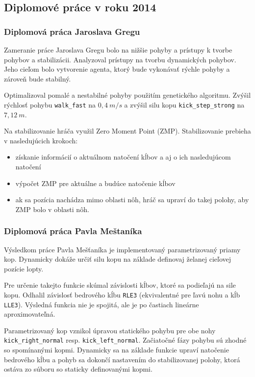\subsection{Diplomové práce v roku 2014}

\subsubsection{Diplomová práca Jaroslava Gregu}
Zameranie práce Jaroslava Gregu \cite{grega} bolo na nižšie pohyby a prístupy k tvorbe pohybov a stabilizácii. Analyzoval prístupy na tvorbu dynamických pohybov. Jeho cieľom bolo vytvorenie agenta, ktorý bude vykonávať rýchle pohyby a zároveň bude stabilný. 

Optimalizoval pomalé a nestabilné pohyby použitím genetického algoritmu. Zvýšil rýchlosť pohybu \texttt{walk\_fast} na $0,4~m/s$ a zvýšil silu kopu \texttt{kick\_step\_strong} na $7,12~m$.

Na stabilizovanie hráča využil Zero Moment Point (ZMP). Stabilizovanie prebieha v nasledujúcich krokoch:
\begin{itemize}
	\item získanie informácií o aktuálnom natočení kĺbov a aj o ich nasledujúcom natočení
	\item výpočet ZMP pre aktuálne a budúce natočenie kĺbov
	\item ak sa pozícia nachádza mimo oblasti nôh, hráč sa upraví do takej polohy, aby ZMP bolo v oblasti nôh.
\end{itemize}

\subsubsection{Diplomová práca Pavla Meštaníka} \label{sec_mestanik}

Výsledkom práce Pavla Mešťaníka \cite{mestanik} je implementovaný parametrizovaný priamy kop. Dynamicky dokáže určiť silu kopu na základe definovaj želanej cieľovej pozície lopty. 

Pre určenie takejto funkcie skúmal závislosti kĺbov, ktoré sa podieľajú na sile kopu. Odhalil závislosť bedrového kĺbu \texttt{RLE3} (ekvivalentné pre ľavú nohu a kĺb \texttt{LLE3}). Výsledná funkcia nie je spojitá, ale je po častiach lineárne aproximovateľná. 

Parametrizovaný kop vznikol úpravou statického pohybu pre obe nohy \texttt{kick\_right\_normal} resp. \texttt{kick\_left\_normal}. Začiatočné fázy pohybu sú zhodné so spomínanými kopmi. Dynamicky sa na základe funkcie upraví natočenie bedrového kĺbu a pohyb sa dokončí nastavením do stabilizovanej polohy, ktorá ostáva zo súboru so staticky definovanými kopmi.

